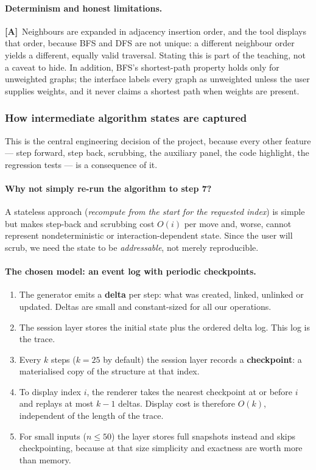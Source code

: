 \documentclass[11pt,a4paper]{article}
\newcommand{\A}{\textcolor{asmc}{\textbf{[A]}}}     %
\begin{document}
\paragraph{Determinism and honest limitations.} \A\ Neighbours are expanded in adjacency
insertion order, and the tool displays that order, because BFS and DFS are not unique: a
different neighbour order yields a different, equally valid traversal. Stating this is part
of the teaching, not a caveat to hide. In addition, BFS's shortest-path property holds only
for unweighted graphs; the interface labels every graph as unweighted unless the user
supplies weights, and it never claims a shortest path when weights are present.

\subsubsection{How intermediate algorithm states are captured}

This is the central engineering decision of the project, because every other feature ---
step forward, step back, scrubbing, the auxiliary panel, the code highlight, the regression
tests --- is a consequence of it.

\paragraph{Why not simply re-run the algorithm to step 7?} A stateless approach
(\emph{recompute from the start for the requested index}) is simple but makes step-back and
scrubbing cost $O(i)$ per move and, worse, cannot represent nondeterministic or
interaction-dependent state. Since the user will scrub, we need the state to be
\emph{addressable}, not merely reproducible.

\paragraph{The chosen model: an event log with periodic checkpoints.}
\begin{enumerate}[leftmargin=1.6em,itemsep=2pt]
  \item The generator emits a \textbf{delta} per step: what was created, linked, unlinked or
        updated. Deltas are small and constant-sized for all our operations.
  \item The session layer stores the initial state plus the ordered delta log. This log is the
        trace.
  \item Every $k$ steps ($k = 25$ by default) the session layer records a
        \textbf{checkpoint}: a materialised copy of the structure at that index.
  \item To display index $i$, the renderer takes the nearest checkpoint at or before $i$ and
        replays at most $k-1$ deltas. Display cost is therefore $O(k)$, independent of the
        length of the trace.
  \item For small inputs ($n \le 50$) the layer stores full snapshots instead and skips
        checkpointing, because at that size simplicity and exactness are worth more than
        memory.
\end{enumerate}
\end{document}

